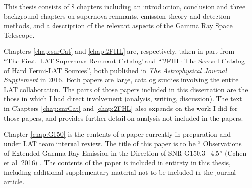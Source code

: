 This thesis consists of 8 chapters  including an introduction, conclusion and three background chapters on supernova remnants, \gam{} emission theory and detection methods, and a description of the relevant aspects of the \Fermi{} Gamma Ray Space Telescope.

Chapters \ref{chap:snrCat} and  \ref{chap:2FHL} are, respectively, taken in part from ``The First \Fermi{}-LAT Supernova Remnant Catalog''and ``'2FHL: The Second Catalog of Hard Fermi-LAT Sources'', both published in \emph{The Astrophysical Journal Supplement} in 2016. Both papers are large, catalog studies involving the entire LAT collaboration. The parts of those papers included in this dissertation are the those in which I had direct involvement (analysis, writing, discussion). The text in Chapters \ref{chap:snrCat} and \ref{chap:2FHL} also expands on the work I did for those papers, and provides further detail on analysis not included in the papers.

Chapter \ref{chap:G150} is the contents of a paper currently in preparation and under LAT team internal review. The title of this paper is to be ``\FermiLat{} Observations of Extended Gamma-Ray Emission in the Direction of SNR G150.3+4.5'' (Cohen et al. 2016) . The contents of the paper is included in entirety in this thesis, including additional supplementary material not to be included in the journal article. 


